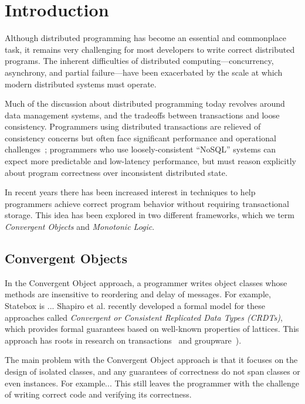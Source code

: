\section{Introduction}
\label{sec:intro}
Although distributed programming has become an essential and commonplace task,
it remains very challenging for most developers to write correct distributed
programs. The inherent difficulties of distributed computing---concurrency,
asynchrony, and partial failure---have been exacerbated by the scale at which
modern distributed systems must operate.

Much of the discussion about distributed programming today revolves around data management systems, and the tradeoffs between transactions and loose consistency.  Programmers using distributed transactions are relieved of consistency concerns but often face significant performance and operational challenges~\cite{birman-ladis}; programmers who use loosely-consistent ``NoSQL'' systems can expect more predictable and low-latency performance, but must reason explicitly about program correctness over inconsistent distributed state.

In recent years there has been increased interest in techniques to help programmers achieve correct program behavior without requiring transactional storage.  This idea has been explored in two different frameworks, which we term {\em Convergent Objects} and {\em Monotonic Logic}.

\subsection{Convergent Objects}
In the Convergent Object approach, a programmer writes object classes whose methods are insensitive to reordering and delay of messages.  For example, Statebox is ...  Shapiro et al. recently developed a formal model for these approaches called {\em Convergent or Consistent Replicated Data Types (CRDTs)}, which provides formal guarantees based on well-known properties of lattices.   This approach has roots in research on transactions~\cite{Garcia-Molina1983,Farrag1989} and groupware~\cite{operational_transformations}).

The main problem with the Convergent Object approach is that it focuses on the design of isolated classes, and any guarantees of correctness do not span classes or even instances.  For example...  This still leaves the programmer with the challenge of writing correct code and verifying its correctness.

